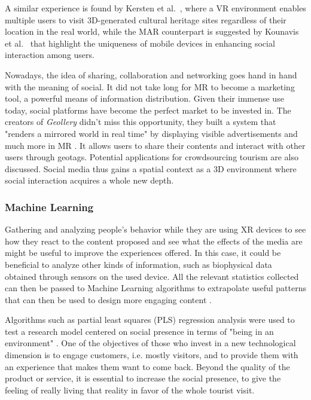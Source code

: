 A similar experience is found by Kersten et al.~\cite{kersten_virtual_2018}, where a VR environment enables multiple users to visit 3D-generated cultural heritage sites regardless of their location in the real world, while the MAR counterpart is suggested by Kounavis et al.~\cite{kounavis_enhancing_2012} that highlight the uniqueness of mobile devices in enhancing social interaction among users.

Nowadays, the idea of sharing, collaboration and networking goes hand in hand with the meaning of social. It did not take long for MR to become a marketing tool, a powerful means of information distribution. Given their immense use today, social platforms have become the perfect market to be invested in. The creators of \textit{Geollery} didn't miss this opportunity, they built a system that "renders a mirrored world in real time" by displaying visible advertisements and much more in MR \cite{du_experiencing_2019}. It allows users to share their contents and interact with other users through geotags. Potential applications for crowdsourcing tourism are also discussed. Social media thus gains a spatial context as a 3D environment where social interaction acquires a whole new depth. 

\subsubsection{Machine Learning}
Gathering and analyzing people's behavior while they are using XR devices to see how they react to the content proposed and see what the effects of the media are might be useful to improve the experiences offered. In this case, it could be beneficial to analyze other kinds of information, such as biophysical data \cite{marchiori_measuring_2017} obtained through sensors on the used device. All the relevant statistics collected can then be passed to Machine Learning algorithms to extrapolate useful patterns that can then be used to design more engaging content \cite{laurell_exploring_2019}.

Algorithms such as partial least squares (PLS) regression analysis were used to test a research model centered on social presence in terms of "being in an environment" \cite{jung_effects_2016}. One of the objectives of those who invest in a new technological dimension is to engage customers, i.e. mostly visitors, and to provide them with an experience that makes them want to come back. Beyond the quality of the product or service, it is essential to increase the social presence, to give the feeling of really living that reality in favor of the whole tourist visit. 

